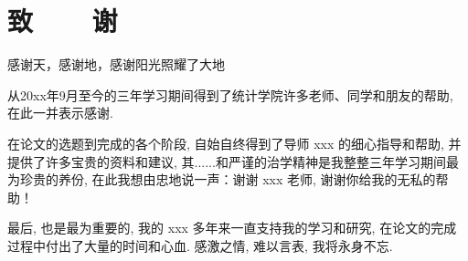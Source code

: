 
\renewcommand{\baselinestretch}{1.8}

\chapter*{致~~~~谢}

感谢天，感谢地，感谢阳光照耀了大地~~~~~~

从20xx年9月至今的三年学习期间得到了统计学院许多老师、同学和朋友的帮助, 在此一并表示感谢.


在论文的选题到完成的各个阶段, 自始自终得到了导师 xxx
的细心指导和帮助, 并提供了许多宝贵的资料和建议, 其......和严谨的治学精神是我整整三年学习期间最为珍贵的养份,
在此我想由忠地说一声：谢谢 xxx 老师, 谢谢你给我的无私的帮助！


最后, 也是最为重要的, 我的 xxx 多年来一直支持我的学习和研究, 在论文的完成过程中付出了大量的时间和心血. 
感激之情, 难以言表, 我将永身不忘.
